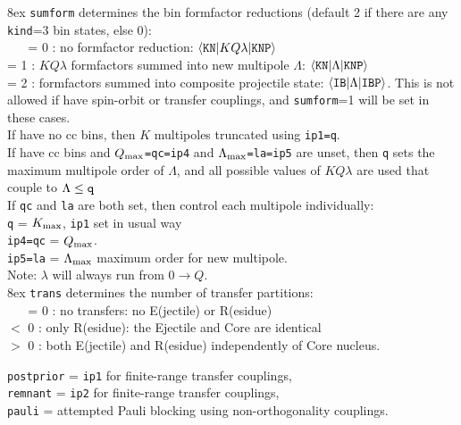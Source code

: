 \documentclass[11pt]{article}
\begin{document}
\hangindent 8ex
{\tt sumform} determines the bin formfactor reductions
(default 2 if there are any {\tt kind}=3 bin states, else 0):\\
~ ~   = 0 : no formfactor reduction:
     $\langle {\tt KN} | K Q \lambda | {\tt KNP} \rangle$
\\    = 1 : $KQ\lambda$ formfactors summed into new multipole $\Lambda$:
     $\langle {\tt KN} | \Lambda | {\tt KNP} \rangle$
\\    = 2 : formfactors summed into composite projectile state:
     $\langle {\tt IB} | {\Lambda} | {\tt IBP} \rangle$.
      This is not allowed if have spin-orbit or transfer couplings, and
      {\tt sumform}=1 will be set in these cases.\\

If have no cc bins, then $K$ multipoles truncated using {\tt ip1=q}.\\
If have cc bins and $Q_{\rm max}${\tt =qc=ip4} and
$\Lambda_{\rm max}${\tt =la=ip5} are unset, then
{\tt q} sets the maximum multipole order of $\Lambda$, and
 all possible values of  $KQ\lambda$ are used that couple to $\Lambda \le {\tt q}$\\
If {\tt qc} and {\tt la} are both set, then control each multipole
individually:\\
\hspace*{1cm} {\tt q}     = $K_{\rm max}$,  {\tt ip1} set in usual way\\
\hspace*{1cm} {\tt ip4=qc}  = $Q_{\rm max}$. \\
\hspace*{1cm} {\tt ip5=la} = $\Lambda_{\rm max}$ maximum order for new
multipole.\\
\hspace*{1cm}  Note: $\lambda$ will always run from $0\rightarrow Q$.\\


\hangindent 8ex
{\tt trans} determines the number of transfer partitions:\\
~ ~   = 0 : no transfers: no E(jectile) or R(esidue)
\\    $<$ 0 : only R(esidue): the Ejectile and Core are identical
\\    $>$ 0 : both E(jectile) and R(esidue) independently of Core nucleus.

{\tt postprior} = {\tt ip1} for finite-range transfer couplings,\\
{\tt remnant} = {\tt ip2} for finite-range transfer couplings,\\
{\tt pauli} = attempted Pauli blocking using non-orthogonality couplings.
\end{document}
